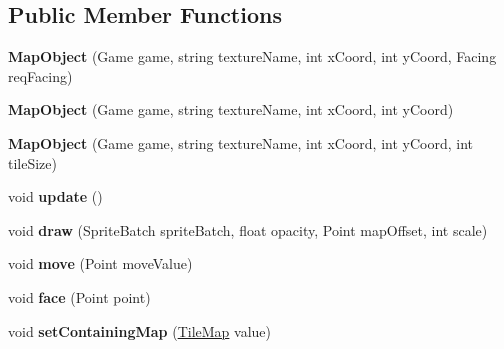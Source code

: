 \subsection*{Public Member Functions}
\begin{DoxyCompactItemize}
\item 
\hypertarget{class_simple_r_p_g_1_1_map_object_ac8d60dc3cf08cb96a718209e32beecda}{{\bfseries Map\-Object} (Game game, string texture\-Name, int x\-Coord, int y\-Coord, Facing req\-Facing)}\label{class_simple_r_p_g_1_1_map_object_ac8d60dc3cf08cb96a718209e32beecda}

\item 
\hypertarget{class_simple_r_p_g_1_1_map_object_aa3fefac8f45293267c07618a32293ea0}{{\bfseries Map\-Object} (Game game, string texture\-Name, int x\-Coord, int y\-Coord)}\label{class_simple_r_p_g_1_1_map_object_aa3fefac8f45293267c07618a32293ea0}

\item 
\hypertarget{class_simple_r_p_g_1_1_map_object_a343f9c1780eb489f4bdf1539cd9c9aa0}{{\bfseries Map\-Object} (Game game, string texture\-Name, int x\-Coord, int y\-Coord, int tile\-Size)}\label{class_simple_r_p_g_1_1_map_object_a343f9c1780eb489f4bdf1539cd9c9aa0}

\item 
\hypertarget{class_simple_r_p_g_1_1_map_object_a4f44437b2648e204421cb4ebe20444b2}{void {\bfseries update} ()}\label{class_simple_r_p_g_1_1_map_object_a4f44437b2648e204421cb4ebe20444b2}

\item 
\hypertarget{class_simple_r_p_g_1_1_map_object_a1140405f31bbcc5fa466c50e0a22bb7e}{void {\bfseries draw} (Sprite\-Batch sprite\-Batch, float opacity, Point map\-Offset, int scale)}\label{class_simple_r_p_g_1_1_map_object_a1140405f31bbcc5fa466c50e0a22bb7e}

\item 
\hypertarget{class_simple_r_p_g_1_1_map_object_aee23ac75f7495b486038e13b056a6e83}{void {\bfseries move} (Point move\-Value)}\label{class_simple_r_p_g_1_1_map_object_aee23ac75f7495b486038e13b056a6e83}

\item 
\hypertarget{class_simple_r_p_g_1_1_map_object_adb50148e1809aba8d0b1c45ee5937aee}{void {\bfseries face} (Point point)}\label{class_simple_r_p_g_1_1_map_object_adb50148e1809aba8d0b1c45ee5937aee}

\item 
\hypertarget{class_simple_r_p_g_1_1_map_object_a20db9118baf359ac6b4caa6096adf097}{void {\bfseries set\-Containing\-Map} (\hyperlink{class_simple_r_p_g_1_1_tile_map}{Tile\-Map} value)}\label{class_simple_r_p_g_1_1_map_object_a20db9118baf359ac6b4caa6096adf097}


\end{DoxyCompactItemize}
